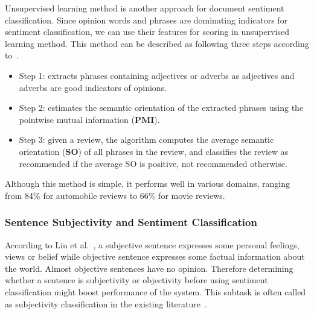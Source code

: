 \documentclass{article}
\begin{document}
Unsupervised learning method is another approach for document sentiment classification. 
Since opinion words and phrases are dominating indicators for sentiment classification, we can use their features for scoring in unsupervised learning method.
This method can be described as following three steps according to~\cite{DBLP:journals/corr/cs-LG-0212032}.
\begin{itemize}
    \item Step 1: extracts phrases containing adjectives or adverbs as adjectives and adverbs are good indicators of opinions.
    \item Step 2: estimates the semantic orientation of the extracted phrases using the pointwise mutual information (\textbf{PMI}).
    \item Step 3: given a review, the algorithm computes the average semantic orientation (\textbf{SO}) of all phrases in the review, and classifies the review as recommended if the average SO is positive, not recommended otherwise.
\end{itemize}
Although this method is simple, it performs well in various domains, ranging from 84\% for automobile reviews to 66\% for movie reviews.

\subsubsection{Sentence Subjectivity and Sentiment Classification}
According to Liu et al.~\cite{Liu2012}, a subjective sentence expresses some personal feelings, views or belief while objective sentence expresses some factual information about the world.
Almost objective sentences have no opinion.
Therefore determining whether a sentence is subjectivity or objectivity before using sentiment classification might boost  performance of the system.
This subtask is often called as subjectivity classification in the existing literature~\cite{Hatzivassiloglou:2000:EAO:990820.990864, Pang:2005:SSE:1219840.1219855, Pang:2002:TUS:1118693.1118704, Wiebe:2004:LSL:1105596.1105598, Wilson:2004:JMY:1597148.1597270, COIN:COIN275, Yu:2003:TAO:1119355.1119372}. 
\end{document}
